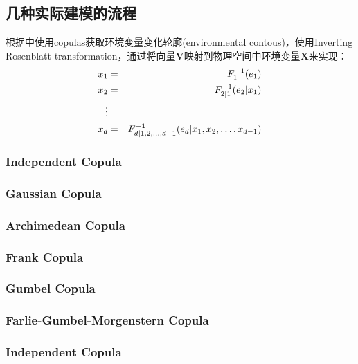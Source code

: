 \subsection{几种实际建模的流程}
根据\cite{Montes2015}中使用copulas获取环境变量变化轮廓(environmental contous)，使用\textcolor[rgb]{1,0,0}{Inverting Rosenblatt transformation}，通过将向量$\mathbf{V}$映射到物理空间中环境变量$\mathbf{X}$来实现：
\begin{eqnarray}
    x_1 &=& F_1^{-1}(e_1)  \notag \\
    x_2 &=& F_{2|1}^{-1}(e_2|x_1) \notag \\
    \vdots \\
    x_d &=& F_{d|1,2,\dots,d-1}^{-1} (e_d | x_1,x_2,\dots,x_{d-1}) \notag
    \label{eq-invervse-rosenblatt}
\end{eqnarray}

\subsubsection{Independent Copula}
\subsubsection{Gaussian Copula}
\subsubsection{Archimedean Copula}
\subsubsection{Frank Copula}
\subsubsection{Gumbel Copula}
\subsubsection{Farlie-Gumbel-Morgenstern  Copula}
\subsubsection{Independent Copula}
